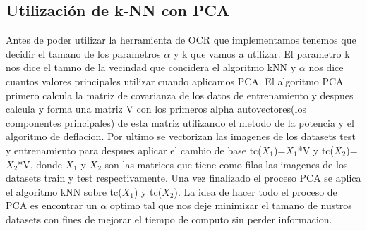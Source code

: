 
\subsection{Utilización de k-NN con PCA}

Antes de poder utilizar la herramienta de OCR que implementamos tenemos que decidir el tamano de los parametros $\alpha$ y k que vamos a utilizar. El parametro k nos dice el tamno de la vecindad que concidera el algoritmo kNN y $\alpha$ nos dice cuantos valores principales utilizar cuando aplicamos PCA.
	El algoritmo PCA primero calcula la matriz de covarianza de los datos de entrenamiento y despues calcula y forma una matriz V con los primeros alpha autovectores(los componentes principales) de esta matriz utilizando el metodo de la potencia y el algoritmo de deflacion. Por ultimo se vectorizan las imagenes de los datasets test y entrenamiento para despues aplicar el cambio de base tc($X_{1}$)=$X_{1}$*V y tc($X_{2}$)=$X_{2}$*V, donde $X_{1}$ y $X_{2}$ son las matrices que tiene como filas las imagenes de los datasets train y test respectivamente. Una vez finalizado el proceso PCA se aplica el algoritmo kNN sobre  tc($X_{1}$) y tc($X_{2}$). La idea de hacer todo el proceso de PCA es encontrar un $\alpha$ optimo tal que nos deje minimizar el tamano de nustros datasets con fines de mejorar el tiempo de computo sin perder informacion.
